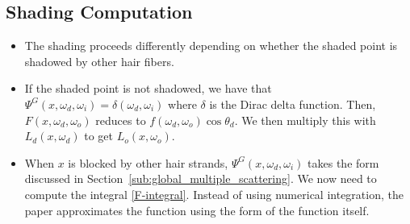 \documentclass[10pt]{article}
\begin{document}
  \subsection{Shading Computation}
  \begin{itemize}
    \item The shading proceeds differently depending on whether the shaded point is shadowed by other hair fibers.

    \item If the shaded point is not shadowed, we have that $\Psi^G(x, \omega_d, \omega_i) = \delta(\omega_d, \omega_i)$ where $\delta$ is the Dirac delta function.  Then, $F(x, \omega_d, \omega_o)$ reduces to $f(\omega_d, \omega_o) \cos \theta_d$.  We then multiply this with $L_d(x,\omega_d)$ to get $L_o(x,\omega_o)$.

    \item When $x$ is blocked by other hair strands, $\Psi^G(x, \omega_d, \omega_i)$ takes the form discussed in Section~\ref{sub:global_multiple_scattering}.  We now need to compute the integral \eqref{F-integral}.  Instead of using numerical integration, the paper approximates the function using the form of the function itself.


\end{itemize}
\end{document}
